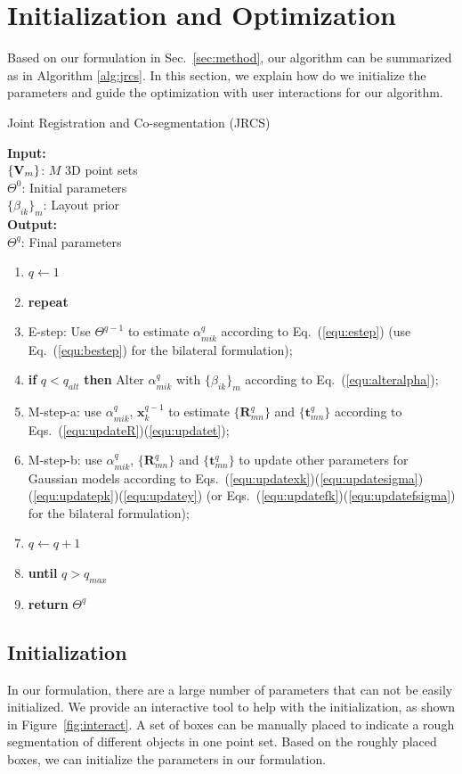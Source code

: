 \section{Initialization and Optimization}
\label{sec:imp}
Based on our formulation in Sec.~\ref{sec:method}, our algorithm can be summarized as in Algorithm \ref{alg:jrcs}.
%
In this section, we explain how do we initialize the parameters and guide the optimization with user interactions for our algorithm.

\begin{algorithm}[htb]
	\caption{Joint Registration and Co-segmentation (JRCS)}
	\label{alg:jrcs}
	\textbf{Input:}~~\\  
	$\{\mathbf{V}_m\}$: $M$ 3D point sets\\
	$\Theta^0$: Initial parameters\\
	$\{\beta_{ik}\}_{m}$: Layout prior\\
	\textbf{Output:}~~\\
	$\Theta^q$: Final parameters~~
	\begin{enumerate}
		\item $q\leftarrow1$
		\item \textbf{repeat}
		\item E-step: Use $\Theta^{q-1}$ to estimate $\alpha_{mik}^q$ according to Eq.~(\ref{equ:estep}) (use Eq.~(\ref{equ:bestep}) for the bilateral formulation);
		\item \textbf{if} $q < q_{alt}$ \textbf{then} Alter $\alpha_{mik}^q$ with $\{\beta_{ik}\}_{m}$ according to Eq.~(\ref{equ:alteralpha});
		\item M-step-a: use $\alpha^q_{mik}$, $\mathbf x^{q-1}_k$ to estimate $\{\mathbf{R}_{mn}^q\}$ and $\{\mathbf t_{mn}^q\}$ according to Eqs.~(\ref{equ:updateR})(\ref{equ:updatet});
		\item M-step-b: use $\alpha^q_{mik}$, $\{\mathbf{R}_{mn}^q\}$ and $\{\mathbf{t}_{mn}^q\}$ to update other parameters for Gaussian models according to Eqs.~(\ref{equ:updatexk})(\ref{equ:updatesigma})(\ref{equ:updatepk})(\ref{equ:updatey})  (or Eqs.~(\ref{equ:updatefk})(\ref{equ:updatefsigma}) for the bilateral formulation);
		\item $q \leftarrow q+1$
		\item \textbf{until} $q > q_{max}$
		\item \textbf{return} $\Theta^q$
	\end{enumerate}
\end{algorithm}



\subsection{Initialization}
\label{sec:imp:interact}
%
In our formulation, there are a large number of parameters that can not be easily initialized.
%
We provide an interactive tool to help with the initialization, as shown in Figure~\ref{fig:interact}. 
A set of boxes can be manually placed to indicate a rough segmentation of different objects in one point set.
%
Based on the roughly placed boxes, we can initialize the parameters in our formulation. 

